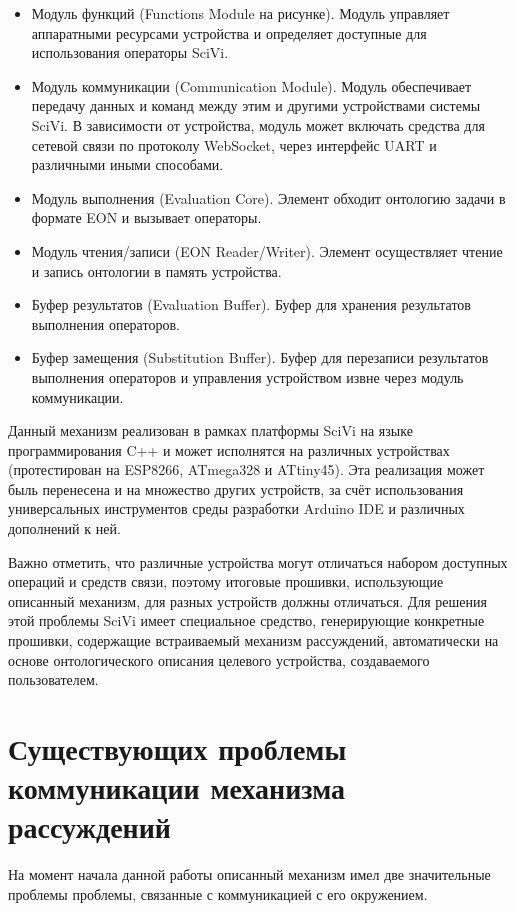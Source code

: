 \begin{itemize}
	\item Модуль функций (Functions Module на рисунке). Модуль управляет аппаратными ресурсами устройства и определяет доступные для использования операторы SciVi.
	\item Модуль коммуникации (Communication Module). Модуль обеспечивает передачу данных и команд между этим и другими устройствами системы SciVi.
	В зависимости от устройства, модуль может включать средства для сетевой связи по протоколу WebSocket, через интерфейс UART и различными иными способами.
	\item Модуль выполнения (Evaluation Core). Элемент обходит онтологию задачи в формате EON и вызывает операторы.
	\item Модуль чтения/записи (EON Reader/Writer). Элемент осуществляет чтение и запись онтологии в память устройства.
	\item Буфер результатов (Evaluation Buffer). Буфер для хранения результатов выполнения операторов.
	\item Буфер замещения (Substitution Buffer). Буфер для перезаписи результатов выполнения операторов и управления устройством извне через модуль коммуникации.
\end{itemize}

Данный механизм реализован в рамках платформы SciVi на языке программирования C++ и может исполнятся на различных устройствах (протестирован на ESP8266, ATmega328 и ATtiny45).
Эта реализация может быль перенесена и на множество других устройств, за счёт использования универсальных инструментов среды разработки Arduino IDE и различных дополнений к ней.

Важно отметить, что различные устройства могут отличаться набором доступных операций и средств связи, поэтому итоговые прошивки, использующие описанный механизм, для разных устройств должны отличаться.
Для решения этой проблемы SciVi имеет специальное средство, генерирующие конкретные прошивки, содержащие встраиваемый механизм рассуждений, автоматически на основе онтологического описания целевого устройства, создаваемого пользователем.

\section{Существующих проблемы коммуникации механизма рассуждений}

На момент начала данной работы описанный механизм имел две значительные проблемы проблемы, связанные с коммуникацией с его окружением.

